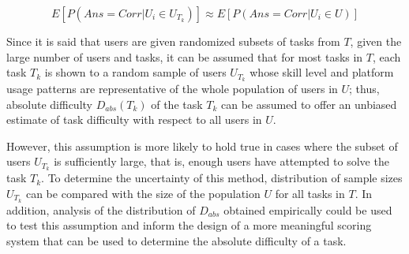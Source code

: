 \begin{equation} \label{eq:dabs_assumption}
    E[P(Ans=Corr|U_i \in U_{T_k})] \approx E[P(Ans=Corr|U_i \in U)]
\end{equation}


Since it is said that users are given randomized subsets of tasks from $T$, given the large number of users and tasks, it can be assumed that for most tasks in $T$, each task $T_k$ is shown to a random sample of users $U_{T_k}$ whose skill level and platform usage patterns are representative of the whole population of users in $U$;
thus, absolute difficulty $D_{abs}(T_k)$ of the task $T_k$ can be assumed to offer an unbiased estimate of task difficulty with respect to all users in $U$.

However, this assumption is more likely to hold true in cases where the subset of users $U_{T_k}$ is sufficiently large, that is, enough users have attempted to solve the task $T_k$.
To determine the uncertainty of this method, distribution of sample sizes $U_{T_k}$ can be compared with the size of the population $U$ for all tasks in $T$.
In addition, analysis of the distribution of $D_{abs}$ obtained empirically could be used to test this assumption and inform the design of a more meaningful scoring system that can be used to determine the absolute difficulty of a task.

